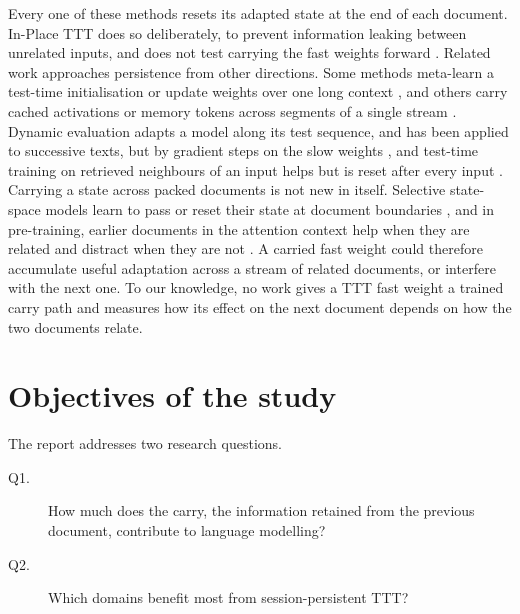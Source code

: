 \documentclass[12pt,a4paper]{report}
\begin{document}
Every one of these methods resets its adapted state at the end of each document. In-Place TTT does so deliberately, to prevent information leaking between unrelated inputs, and does not test carrying the fast weights forward \citep{feng2026inplace}. Related work approaches persistence from other directions. Some methods meta-learn a test-time initialisation or update weights over one long context \citep{tandon2025endtoend,bansal2025letsnot,wang2026learning}, and others carry cached activations or memory tokens across segments of a single stream \citep{dai2019transformerxl,rae2019compressive,bulatov2022rmt}. Dynamic evaluation adapts a model along its test sequence, and has been applied to successive texts, but by gradient steps on the slow weights \citep{krause2018dynamic,lazaridou2021mind}, and test-time training on retrieved neighbours of an input helps but is reset after every input \citep{hardt2024test}. Carrying a state across packed documents is not new in itself. Selective state-space models learn to pass or reset their state at document boundaries \citep{gu2024mamba}, and in pre-training, earlier documents in the attention context help when they are related and distract when they are not \citep{zhao2024analysing}. A carried fast weight could therefore accumulate useful adaptation across a stream of related documents, or interfere with the next one. To our knowledge, no work gives a TTT fast weight a trained carry path and measures how its effect on the next document depends on how the two documents relate.

\section{Objectives of the study}

The report addresses two research questions.
\begin{description}
  \item[Q1.] How much does the carry, the information retained from the previous document, contribute to language modelling?
  \item[Q2.] Which domains benefit most from session-persistent TTT?
\end{description}
\end{document}
